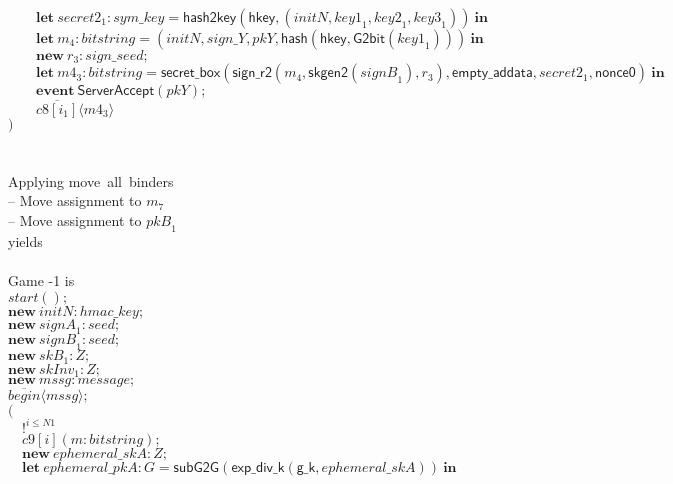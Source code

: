 \documentclass{article}
\newcommand{\cinput}[2]{{#1}({#2})}
\newcommand{\coutput}[2]{\overline{#1}\langle{#2}\rangle}
\newcommand{\kw}[1]{\mathbf{#1}}
\newcommand{\kwf}[1]{\mathsf{#1}}
\newcommand{\var}[1]{\mathit{#1}}
\newcommand{\kwt}[1]{\mathit{#1}}
\newcommand{\kwp}[1]{\mathit{#1}}
\newcommand{\kwc}[1]{\mathit{#1}}
\begin{document}
\begin{tabbing}
\>$\quad \quad \kw{let}\ \var{secret2}_{1}: \kwt{sym{\_}key} = \kwf{hash2key}(\kwf{hkey}, \kwf{}(\var{initN}, \var{key1}_{1}, \var{key2}_{1}, \var{key3}_{1}))\ \kw{in}$\\
\>$\quad \quad \kw{let}\ \var{m}_{4}: \kwt{bitstring} = \kwf{}(\var{initN}, \var{sign{\_}Y}, \var{pkY}, \kwf{hash}(\kwf{hkey}, \kwf{G2bit}(\var{key1}_{1})))\ \kw{in}$\\
\>$\quad \quad \kw{new}\ \var{r}_{3}: \kwt{sign{\_}seed};$\\
\>$\quad \quad \kw{let}\ \var{m4}_{3}: \kwt{bitstring} = \kwf{secret{\_}box}(\kwf{sign{\_}r2}(\var{m}_{4}, \kwf{skgen2}(\var{signB}_{1}), \var{r}_{3}), \kwf{empty{\_}addata}, \var{secret2}_{1}, \kwf{nonce0})\ \kw{in}$\\
\>$\quad \quad \kw{event}\ \kwf{ServerAccept}(\var{pkY});$\\
\>$\quad \quad \coutput{\kwc{c8}[\var{i}_{1}]}{\var{m4}_{3}}$\\
\>$)$\\
\\
\\
Applying move\ all\ binders\\
\quad -- Move assignment to $\var{m}_{7}$\\
\quad -- Move assignment to $\var{pkB}_{1}$\\
yields\\
\\
Game -1 is\\
\>$\cinput{\kwc{start}}{};$\\
\>$\kw{new}\ \var{initN}: \kwt{hmac{\_}key};$\\
\>$\kw{new}\ \var{signA}_{1}: \kwt{seed};$\\
\>$\kw{new}\ \var{signB}_{1}: \kwt{seed};$\\
\>$\kw{new}\ \var{skB}_{1}: \kwt{Z};$\\
\>$\kw{new}\ \var{skInv}_{1}: \kwt{Z};$\\
\>$\kw{new}\ \var{mssg}: \kwt{message};$\\
\>$\coutput{\kwc{begin}}{\var{mssg}};$\\
\>$($\\
\>$\quad !^{\var{i} \leq \kwp{N1}}$\\
\>$\quad \cinput{\kwc{c9}[\var{i}]}{\var{m}: \kwt{bitstring}};$\\
\>$\quad \kw{new}\ \var{ephemeral{\_}skA}: \kwt{Z};$\\
\>$\quad \kw{let}\ \var{ephemeral{\_}pkA}: \kwt{G} = \kwf{subG2G}(\kwf{exp{\_}div{\_}k}(\kwf{g{\_}k}, \var{ephemeral{\_}skA}))\ \kw{in}$\\

\end{tabbing}
\end{document}
